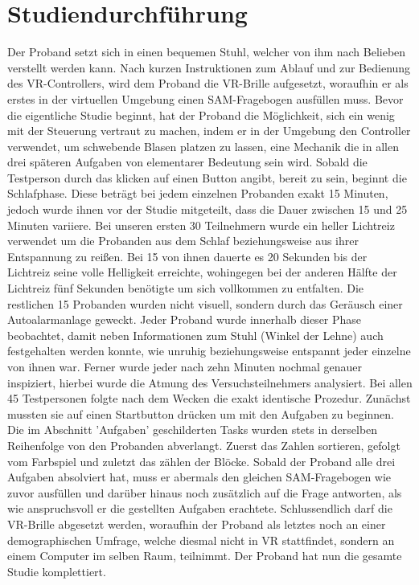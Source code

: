 \section{Studiendurchführung}

Der Proband setzt sich in einen bequemen Stuhl, welcher von ihm nach Belieben verstellt werden kann. Nach kurzen Instruktionen zum Ablauf und zur Bedienung des VR-Controllers, wird dem Proband die VR-Brille aufgesetzt, woraufhin er als erstes in der virtuellen Umgebung einen SAM-Fragebogen ausfüllen muss. %
Bevor die eigentliche Studie beginnt, hat der Proband die Möglichkeit, sich ein wenig mit der Steuerung vertraut zu machen, indem er in der Umgebung den Controller verwendet, um schwebende Blasen platzen zu lassen, eine Mechanik die in allen drei späteren Aufgaben von elementarer Bedeutung sein wird. Sobald die Testperson durch das klicken auf einen Button angibt, bereit zu sein, beginnt die Schlafphase. Diese beträgt bei jedem einzelnen Probanden exakt 15 Minuten, jedoch wurde ihnen vor der Studie mitgeteilt, dass die Dauer zwischen 15 und 25 Minuten variiere. %
Bei unseren ersten 30 Teilnehmern wurde ein heller Lichtreiz verwendet um die Probanden aus dem Schlaf beziehungsweise aus ihrer Entspannung zu reißen. Bei 15 von ihnen dauerte es 20 Sekunden bis der Lichtreiz seine volle Helligkeit erreichte, wohingegen bei der anderen Hälfte der Lichtreiz fünf Sekunden benötigte um sich vollkommen zu entfalten.  Die restlichen 15 Probanden wurden nicht visuell, sondern durch das Geräusch einer Autoalarmanlage geweckt. %
Jeder Proband wurde innerhalb dieser Phase beobachtet, damit neben Informationen zum Stuhl (Winkel der Lehne) auch festgehalten werden konnte, wie unruhig beziehungsweise entspannt jeder einzelne von ihnen war. Ferner wurde jeder nach zehn Minuten nochmal genauer inspiziert, hierbei wurde die Atmung des Versuchsteilnehmers analysiert.
Bei allen 45 Testpersonen folgte nach dem Wecken die exakt identische Prozedur. Zunächst mussten sie auf einen Startbutton drücken um mit den Aufgaben zu beginnen. Die im Abschnitt 'Aufgaben' geschilderten Tasks wurden stets in derselben Reihenfolge von den Probanden abverlangt. Zuerst das Zahlen sortieren, gefolgt vom Farbspiel und zuletzt das zählen der Blöcke. %
Sobald der Proband alle drei Aufgaben absolviert hat, muss er abermals den gleichen SAM-Fragebogen wie zuvor ausfüllen und darüber hinaus noch zusätzlich auf die Frage antworten, als wie anspruchsvoll er die gestellten Aufgaben erachtete.
Schlussendlich darf die VR-Brille abgesetzt werden, woraufhin der Proband als letztes noch an einer demographischen Umfrage, welche diesmal nicht in VR stattfindet, sondern an einem Computer im selben Raum, teilnimmt. Der Proband hat nun die gesamte Studie komplettiert.

